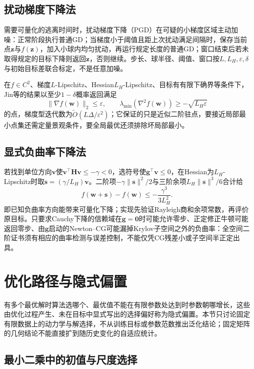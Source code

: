 \subsection{扰动梯度下降法}

需要可量化的逃离时间时，扰动梯度下降（PGD）在可疑的小梯度区域主动加噪：正常阶段执行普通GD；当梯度小于阈值且距上次扰动满足间隔时，保存当前点$\bm z$与$f(\bm z)$，加入小球内均匀扰动，再运行规定长度的普通GD；窗口结束后若未取得规定的目标下降则返回$\bm z$，否则继续。步长、球半径、阈值、窗口按$L,L_H,\varepsilon,\delta$与初始目标差联合标定，不是任意加噪。

在$f\in C^2$、梯度$L$-Lipschitz、Hessian$L_H$-Lipschitz、目标有有限下确界等条件下，Jin等的结果以至少$1-\delta$概率返回满足
\[
 \|\nabla f(\bm w)\|_2\leq\varepsilon,\qquad
 \lambda_{\min}(\nabla^2f(\bm w))\geq-\sqrt{L_H\varepsilon}
\]
的点，梯度型迭代数为$\widetilde O(L\Delta/\varepsilon^2)$；它保证的只是近似二阶驻点，要接近局部最小点集还需定量景观条件，要全局最优还须排除坏局部最小。

\subsection{显式负曲率下降法}

若找到单位方向$\bm v$使$\bm v^\top\bm H\bm v\leq-\gamma<0$，选符号使$\bm g^\top\bm v\leq0$，在Hessian为$L_H$-Lipschitz时取$\bm s=(\gamma/L_H)\bm v$。二阶项$-\gamma\|\bm s\|^2/2$与三阶余项$L_H\|\bm s\|^3/6$合计给
\[
 f(\bm w+\bm s)-f(\bm w)\leq-\frac{\gamma^3}{3L_H^2}.
\]
即已知负曲率方向能带来可量化下降；实现先验证Rayleigh商和余项常数，再评价原目标。只要求Cauchy下降的信赖域在$\bm g=\bm0$时可能允许零步、正定修正牛顿可能返回零步、由$\bm g$启动的Newton--CG可能漏掉Krylov子空间之外的负曲率：全空间二阶证书须有相应的曲率检测与误差控制，不能仅凭CG残差小或子空间半正定出具。

\section{优化路径与隐式偏置}
\label{sec:opt-implicit-bias}

有多个最优解时算法选哪个、最优值不能在有限参数处达到时参数朝哪增长，这些由优化过程产生、未在目标中显式写出的选择偏好称为隐式偏置。本节只讨论固定有限数据上的动力学与解选择，不从训练目标或参数范数推出泛化结论；固定矩阵的几何结论不能直接扩到随历史变化的自适应统计。

\subsection{最小二乘中的初值与尺度选择}

